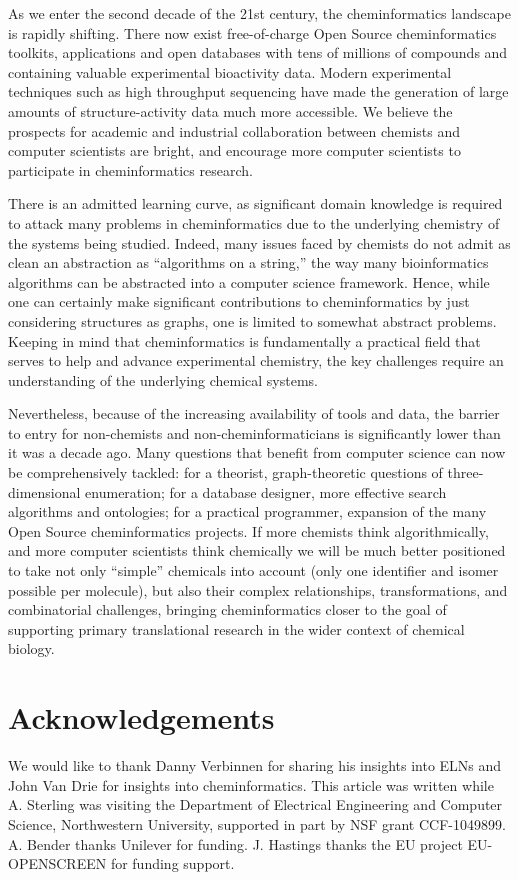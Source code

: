 \documentclass{sig-alternate}
\begin{document}
As we enter the second decade of the 21st century, the cheminformatics
landscape is rapidly shifting.  There now exist free-of-charge Open
Source cheminformatics toolkits, applications and open databases with
tens of millions of compounds and containing valuable experimental
bioactivity data. Modern experimental techniques such as high
throughput sequencing have made the generation of large amounts of
structure-activity data much more accessible.  We believe the
prospects for academic and industrial collaboration between chemists
and computer scientists are bright, and encourage more computer
scientists to participate in cheminformatics research.

There is an admitted learning curve, as significant domain
knowledge is required to attack many problems in cheminformatics due
to the underlying chemistry of the systems being studied. Indeed, many
issues faced by chemists do not admit as clean an abstraction as
``algorithms on a string,'' the way many bioinformatics algorithms can
be abstracted into a computer science framework.  Hence, while
one can certainly make significant contributions to cheminformatics by
just considering structures as graphs, one is limited to somewhat
abstract problems. Keeping in mind that cheminformatics is
fundamentally a practical field that serves to help and advance
experimental chemistry, the key challenges require an understanding of
the underlying chemical systems.

Nevertheless, because of the increasing availability of tools and
data, the barrier to entry for non-chemists and non-cheminformaticians
is significantly lower than it was a decade ago. Many questions that
benefit from computer science can now be comprehensively tackled: for
a theorist, graph-theoretic questions of three-dimensional
enumeration; for a database designer, more effective search algorithms
and ontologies; for a practical programmer, expansion of the many
Open Source cheminformatics projects.  If more chemists think
algorithmically, and more computer scientists think chemically we will be
much better positioned to take not only ``simple'' chemicals into
account (only one identifier and isomer possible per molecule), but
also their complex relationships, transformations, and combinatorial
challenges, bringing cheminformatics closer to the goal of supporting
primary translational research in the wider context of chemical biology.

\section{Acknowledgements}
We would like to thank Danny Verbinnen for sharing his insights into
ELNs and John Van Drie for insights into cheminformatics.  This
article was written while A. Sterling was visiting the Department of
Electrical Engineering and Computer Science, Northwestern University,
supported in part by NSF grant CCF-1049899. A. Bender thanks Unilever
for funding. J. Hastings thanks the EU project EU-OPENSCREEN for
funding support.
\end{document}
